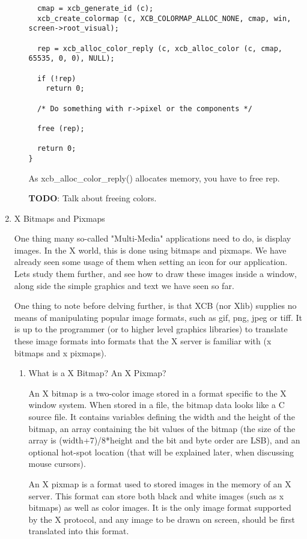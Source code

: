 \documentclass[12pt,oneside,titlepage]{book}
\begin{document}
\begin{enumerate}
\begin{enumerate}
\begin{verbatim}
  cmap = xcb_generate_id (c);
  xcb_create_colormap (c, XCB_COLORMAP_ALLOC_NONE, cmap, win, screen->root_visual);

  rep = xcb_alloc_color_reply (c, xcb_alloc_color (c, cmap, 65535, 0, 0), NULL);

  if (!rep)
    return 0;

  /* Do something with r->pixel or the components */

  free (rep);

  return 0;
}
\end{verbatim}

    As {xcb\_alloc\_color\_reply()} allocates memory, you have to free
    {rep}.

    \textbf{TODO}: Talk about freeing colors.
  \end{enumerate}
\item
  \protect\hypertarget{pixmaps}{}{X Bitmaps and Pixmaps}

  One thing many so-called "Multi-Media" applications need to do, is
  display images. In the X world, this is done using bitmaps and
  pixmaps. We have already seen some usage of them when setting an icon
  for our application. Lets study them further, and see how to draw
  these images inside a window, along side the simple graphics and text
  we have seen so far.

  One thing to note before delving further, is that XCB (nor Xlib)
  supplies no means of manipulating popular image formats, such as gif,
  png, jpeg or tiff. It is up to the programmer (or to higher level
  graphics libraries) to translate these image formats into formats that
  the X server is familiar with (x bitmaps and x pixmaps).

  \begin{enumerate}
  \item
    \protect\hypertarget{pixmapswhat}{}{What is a X Bitmap? An X
    Pixmap?}

    An X bitmap is a two-color image stored in a format specific to the
    X window system. When stored in a file, the bitmap data looks like a
    C source file. It contains variables defining the width and the
    height of the bitmap, an array containing the bit values of the
    bitmap (the size of the array is (width+7)/8*height and the bit and
    byte order are LSB), and an optional hot-spot location (that will be
    explained later, when discussing mouse cursors).

    An X pixmap is a format used to stored images in the memory of an X
    server. This format can store both black and white images (such as x
    bitmaps) as well as color images. It is the only image format
    supported by the X protocol, and any image to be drawn on screen,
    should be first translated into this format.


\end{enumerate}
\end{enumerate}
\end{document}
